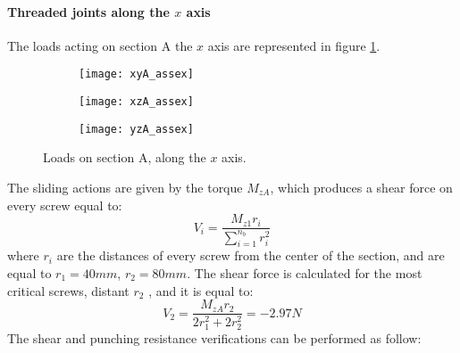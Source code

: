 \paragraph{Threaded joints along the $x$ axis} The loads acting on section A the $x$ axis are represented in figure \ref{fig:sectionxA}.\\
\begin{figure}[h!]
    \centering
    \begin{subfigure}{0.32\linewidth}
    	\centering \texttt{[image: xyA\_assex]} 
	\end{subfigure}
	\begin{subfigure}{0.32\linewidth}
		\centering \texttt{[image: xzA\_assex]}
	\end{subfigure}
	\begin{subfigure}{0.32\linewidth}
		\centering \texttt{[image: yzA\_assex]} 
	\end{subfigure}    
    \caption{Loads on section A, along the $x$ axis.}
    \label{fig:sectionxA}
\end{figure}
The sliding actions are given by the torque $M_{zA}$, which produces a shear force on every screw equal to:\\
\begin{equation*}
    V_{i} = \frac{M_{z1}r_{i}}{\sum\limits_{i=1}^{n_{{b}}} r^2_{i}}
\end{equation*}
where $r_{i}$ are the distances of every screw from the center of the section, and are equal to $r_{1} = 40 mm$, $r_{2} = 80 mm$. 
The shear force is calculated for the most critical screws, distant $r_{2}$ , and it is equal to:\\
\begin{equation*}
    V_{2} = \frac{M_{zA}r_{2}}{2r^2_{1}+2r^2_{2}} = - 2.97 N
\end{equation*}
The shear and punching resistance verifications can be performed as follow:
